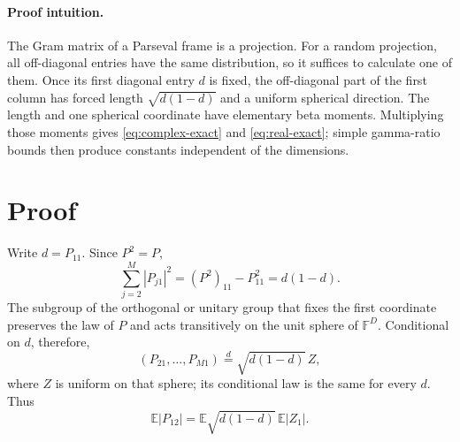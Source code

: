 \documentclass[10pt]{article}
\newcommand{\F}{\mathbb F}
\newcommand{\E}{\mathbb E}
\begin{document}
\paragraph{Proof intuition.}
The Gram matrix of a Parseval frame is a projection.  For a random projection,
all off-diagonal entries have the same distribution, so it suffices to
calculate one of them.  Once its first diagonal entry \(d\) is fixed, the
off-diagonal part of the first column has forced length \(\sqrt{d(1-d)}\) and
a uniform spherical direction.  The length and one spherical coordinate have
elementary beta moments.  Multiplying those moments gives
\eqref{eq:complex-exact} and \eqref{eq:real-exact}; simple gamma-ratio bounds
then produce constants independent of the dimensions.

\section*{Proof}

Write \(d=P_{11}\).  Since \(P^2=P\),
\begin{equation}\label{eq:tailnorm}
 \sum_{j=2}^M|P_{j1}|^2=(P^2)_{11}-P_{11}^2=d(1-d).
\end{equation}
The subgroup of the orthogonal or unitary group that fixes the first
coordinate preserves the law of \(P\) and acts transitively on the unit sphere
of \(\F^D\).  Conditional on \(d\), therefore,
\begin{equation}\label{eq:conditional}
 (P_{21},\ldots,P_{M1}) \stackrel{d}{=}
 \sqrt{d(1-d)}\,Z,
\end{equation}
where \(Z\) is uniform on that sphere; its conditional law is the same for
every \(d\).  Thus
\begin{equation}\label{eq:factor}
 \E|P_{12}|=\E\sqrt{d(1-d)}\,\E|Z_1|.
\end{equation}
\end{document}
